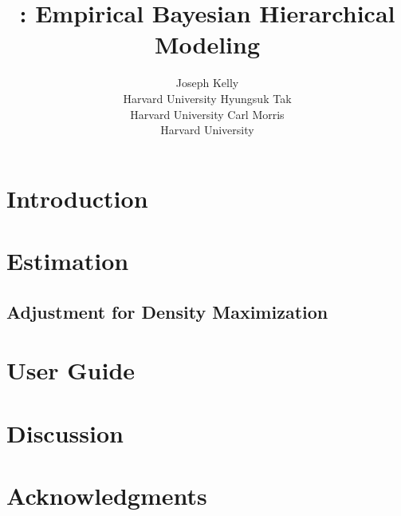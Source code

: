 \documentclass[article]{jss}
\author{Joseph Kelly\\Harvard University \And 
        Hyungsuk Tak\\Harvard University \And
        Carl Morris\\ Harvard University}
\title{\pkg{Rgbp}: Empirical Bayesian Hierarchical Modeling}
\begin{document}

\section[introduction]{Introduction}

\section[estimation]{Estimation}
\subsection[adm]{Adjustment for Density Maximization}

\section[userguide]{User Guide}

\section[discussion]{Discussion}

\section[acknowledgments]{Acknowledgments}
\end{document}
